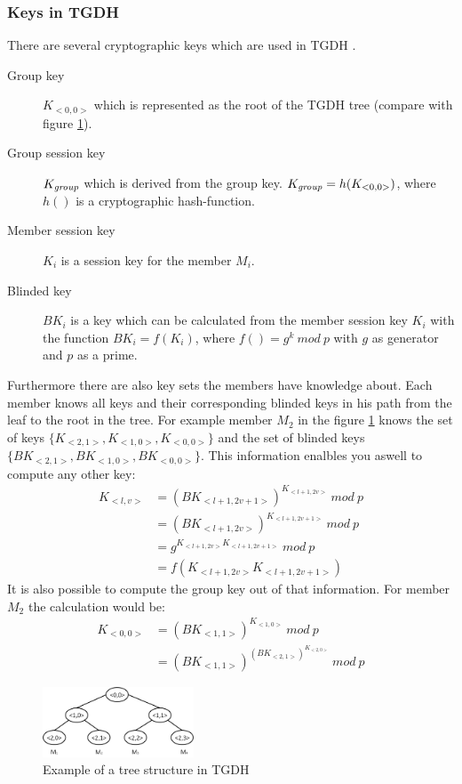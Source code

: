 \subsubsection{Keys in TGDH}
There are several cryptographic keys which are used in TGDH \citep{Liao2004}.
\begin{description}
\item[Group key] $K_{<0,0>}$ which is represented as the root of the TGDH tree (compare with figure \ref{fig:tgdh_tree}).
\item[Group session key] $K_{\text{\textit{group}}}$ which is derived from the group key. $K_{\text{\textit{group}}} = h(K_{<0,0>})$, where $h()$ is a cryptographic hash-function.
\item[Member session key] $K_i$ is a session key for the member $M_i$. 
\item[Blinded key] $BK_i$ is a key which can be calculated from the member session key $K_i$ with the function $BK_i = f(K_i)$, where $f() = g^k~mod~p$ with $g$ as generator and $p$ as a prime.
\end{description}
Furthermore there are also key sets the members have knowledge about. Each member knows all keys and their corresponding blinded keys in his path from the leaf to the root in the tree. For example member $M_2$ in the figure \ref{fig:tgdh_tree} knows the set of keys $\{K_{<2,1>}, K_{<1,0>}, K_{<0,0>}\}$ and the set of blinded keys $\{BK_{<2,1>}, BK_{<1,0>}, BK_{<0,0>}\}$. This information enalbles you aswell to compute any other key:
\begin{align*}
K_{<l,v>} &= (BK_{<l+1, 2v+1>})^{K_{<l+1, 2v>}}~mod~p\\
&= (BK_{<l+1, 2v>})^{K_{<l+1, 2v+1>}}~mod~p\\
&= g^{K_{<l+1, 2v>}K_{<l+1, 2v+1>}}~mod~p\\
&= f(K_{<l+1, 2v>}K_{<l+1, 2v+1>})
\end{align*}
It is also possible to compute the group key out of that information. For member $M_2$ the calculation would be:
\begin{align*}
K_{<0,0>} &= (BK_{<1,1>})^{K_{<1,0>}}~mod~p\\
&= (BK_{<1,1>})^{(BK_{<2,1>})^{K_{<2,0>}}}~mod~p
\end{align*}
\begin{figure}[!h]
\centering\includegraphics[width=0.4\textwidth]{Images/tgdh_tree}
\caption{Example of a tree structure in TGDH}
\label{fig:tgdh_tree}
\end{figure}

